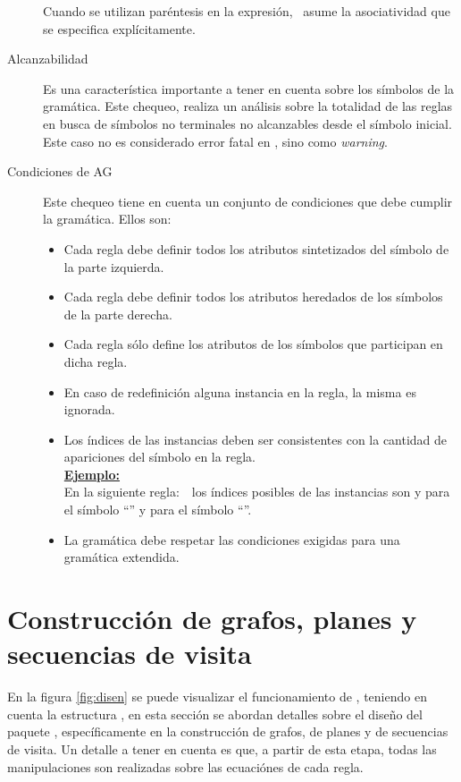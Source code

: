 \begin{description}
Cuando se utilizan paréntesis en la expresión, \maggen\ asume la asociatividad que se especifica explícitamente.

\item [Alcanzabilidad] Es una característica importante a tener en cuenta sobre los símbolos de la gramática. Este chequeo, realiza un análisis sobre la totalidad de las reglas en busca de símbolos no terminales no alcanzables desde el símbolo inicial. Este caso no es considerado error fatal en \maggen, sino como \textit{warning}.

\item [Condiciones de AG] Este chequeo tiene en cuenta un conjunto de condiciones que debe cumplir la gramática. Ellos son:

\begin{itemize}
\item Cada regla debe definir todos los atributos sintetizados del símbolo de la parte izquierda.
\item Cada regla debe definir todos los atributos heredados de los símbolos de la parte derecha.
\item Cada regla sólo define los atributos de los símbolos que participan en dicha regla.
\item En caso de redefinición alguna instancia en la regla, la misma es ignorada.
\item Los índices de las instancias deben ser consistentes con la cantidad de apariciones del símbolo en la regla.\\ \underline{\textbf{Ejemplo:}}\\
En la siguiente regla:\ \ los índices posibles de las instancias son  y  para el símbolo ``'' y  para el símbolo ``''.
\item La gramática debe respetar las condiciones exigidas para una gramática extendida. 
\end{itemize}
\end{description}

\section{Construcción de grafos, planes y secuencias de visita}

En la figura \ref{fig:disen} se puede visualizar el funcionamiento de \maggen, teniendo en cuenta la estructura , en esta sección se abordan detalles sobre el diseño del paquete , específicamente en la construcción de grafos, de planes y de secuencias de visita. Un detalle a tener en cuenta es que, a partir de esta etapa, todas las manipulaciones son realizadas sobre las ecuaciónes de cada regla.

